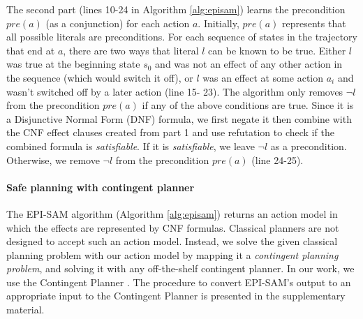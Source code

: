 \documentclass[letterpaper]{article} %
\newcommand{\pre}{\textit{pre}}
\begin{document}
The second part (lines 10-24 in Algorithm \ref{alg:episam}) learns the precondition $pre(a)$ (as a conjunction) for each action $a$. Initially, $pre(a)$ represents that all possible literals are preconditions. For each sequence of states in the trajectory that end at $a$, there are two ways that literal $l$ can be known to be true. Either $l$ was true at the beginning state $s_0$ and was not an effect of any other action in the sequence (which would switch it off), or  $l$ was an effect at some action $a_i$ and wasn't switched off by a later action (line 15- 23). The algorithm only removes $\neg l$ from the precondition $pre(a)$ if any of the above conditions are true. Since it is a Disjunctive Normal Form (DNF) formula, we first negate it then combine with the CNF effect clauses created from part 1 and use refutation to check if the combined formula is \textit{satisfiable}. If it is \textit{satisfiable}, we leave $\neg l$ as a precondition. Otherwise, we remove $\neg l$ from the precondition $\pre(a)$ (line 24-25). 

\paragraph{Safe planning with contingent planner}
The EPI-SAM algorithm (Algorithm \ref{alg:episam}) returns an action model in which the effects are represented by CNF formulas. 
Classical planners are not designed to accept such an action model.
Instead, we solve the given classical planning problem with our action model by mapping it a \emph{contingent planning problem}, and solving it with any off-the-shelf contingent planner. In our work, we use the Contingent Planner \cite{albore2009translation}. The procedure to convert EPI-SAM's output to an appropriate input to the Contingent Planner is presented in the supplementary material. 

\end{document}
